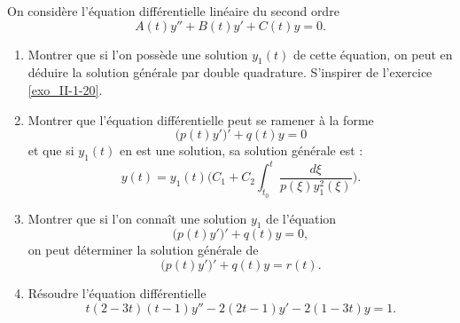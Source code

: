 \begin{exercice}\label{exo_II-1-21}

On considère l'équation différentielle linéaire du second ordre
\begin{equation}
	A(t)y''+B(t)y'+C(t)y=0.
\end{equation}

\begin{enumerate}
\item 
Montrer que si l'on possède une solution $y_1(t)$ de cette équation, on peut en déduire la solution générale par \og double quadrature\fg. S'inspirer de l'exercice \ref{exo_II-1-20}.


\item
Montrer que l'équation différentielle peut se ramener à la forme
\begin{equation}
	\big( p(t)y' \big)'+q(t)y=0
\end{equation}
et que si $y_1(t)$ en est une solution, sa solution générale est :
\begin{equation}
	y(t)=y_1(t)\Big(   C_1+C_2\int_{t_0}^t\frac{ d\xi }{ p(\xi)y_1^2(\xi) } \Big).
\end{equation}

\item 
Montrer que si l'on connaît une solution $y_1$ de l'équation
\begin{equation}
	\big( p(t)y' \big)'+q(t)y=0,
\end{equation}
on peut déterminer la solution générale de
\begin{equation}
	\big( p(t)y' \big)'+q(t)y=r(t).
\end{equation}

\item
Résoudre l'équation différentielle
\begin{equation}
	t(2-3t)(t-1)y''-2(2t-1)y'-2(1-3t)y=1.
\end{equation}

\end{enumerate}


\end{exercice}


